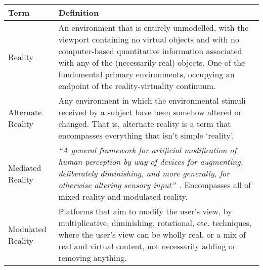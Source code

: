 
\begin{center}
\begin{longtable}{ l p{10cm} }

\toprule

\textbf{Term} & \textbf{Definition} \\

\midrule

		
Reality & An environment that is entirely unmodelled, with the viewport containing no virtual objects and with no computer-based quantitative information associated with any of the (necessarily real) objects. One of the fundamental primary environments, occupying an endpoint of the reality-virtuality continuum. \\
		
\midrule
		

Alternate Reality & Any environment in which the environmental stimuli received by a subject have been somehow altered or changed. That is, alternate reality is a term that encompasses everything that isn't simple `reality'. \\

\midrule
		

Mediated Reality & \textit{``A general framework for artificial modification of human perception by way of devices for augmenting, deliberately diminishing, and more generally, for otherwise altering sensory input''}~\cite{Mann2002a}. Encompasses all of mixed reality and modulated reality. \\

\midrule


Modulated Reality & Platforms that aim to modify the user's view, by multiplicative, diminishing, rotational, etc. techniques, where the user's view can be wholly real, or a mix of real and virtual content, not necessarily adding or removing anything. \\


\end{longtable}
\end{center}
